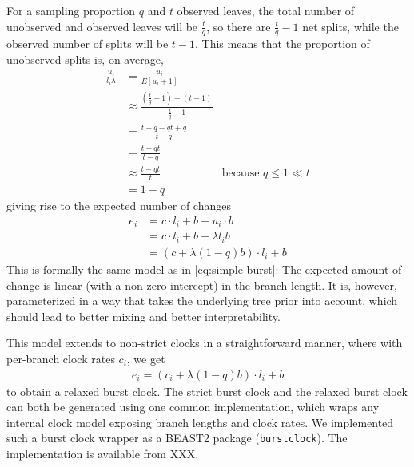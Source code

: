 \documentclass[]{rsos}%
\begin{document}
For a sampling proportion $q$ and $t$ observed leaves, the total number of unobserved and observed leaves will be
$\frac{t}{q}$, so there are $\frac{t}{q} - 1$ net splits,
while the observed number of splits will be $t - 1$. This means that the proportion of unobserved splits is, on average,
\begin{align}
  \frac{u_i}{l_i \lambda}
  &= \frac{u_i}{E[u_i + 1]} \\
  & \approx \frac{(\frac{t}{q} - 1) - (t - 1)}{\frac{t}{q} -1} \\
  & = \frac{t - q - qt + q}{t - q} \\
  & = \frac{t - qt}{t - q} \\
  & \approx \frac{t - qt}{t} &\text{because } q \leq 1 \ll t \\
  & = 1 - q
\end{align}
giving rise to the expected number of changes
\begin{align}
  e_i &= c \cdot l_i + b + u_i \cdot b  \\
  &= c \cdot l_i + b + \lambda l_i b \\
  &= (c + \lambda (1-q) b) \cdot l_i + b
  \label{eq:reparam-burst}
\end{align}
This is formally the same model as in \cref{eq:simple-burst}: The expected amount of change is linear (with a non-zero intercept) in the branch length. It is, however, parameterized
in a way that takes the underlying tree prior into account,
which should lead to better mixing and better interpretability.

This model extends to non-strict clocks in a straightforward manner, where with per-branch clock rates $c_i$, we get
\begin{align}
  e_i = (c_i + \lambda (1-q) b) \cdot l_i + b
  \label{eq:relaxed}
\end{align}
to obtain a relaxed burst clock.
The strict burst clock and the relaxed burst clock can both be generated using one common implementation, which wraps any internal clock model exposing branch lengths and clock rates.
We implemented such a burst clock wrapper as a BEAST2 package (\texttt{burstclock}).
The implementation is available from XXX.
\end{document}
